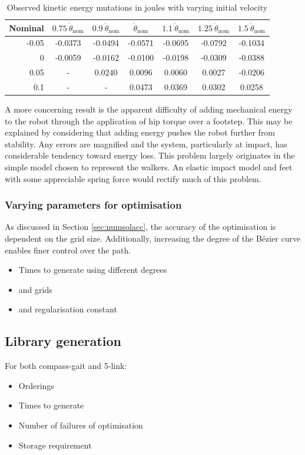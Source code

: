 \begin{table}
	\centering
	\begin{tabular}{ r || c | c | c | c | c | c}
		Nominal & $0.75~\dot{\theta}_{\mathrm{nom}}$ & $0.9~\dot{\theta}_{\mathrm{nom}}$ & $\dot{\theta}_{\mathrm{nom}}$ & $1.1~\dot{\theta}_{\mathrm{nom}}$ & $1.25~\dot{\theta}_{\mathrm{nom}}$ & $1.5~\dot{\theta}_{\mathrm{nom}}$ \\ \hline
		-0.05 & -0.0373 & -0.0494 & -0.0571 & -0.0695 & -0.0792 & -0.1034  \\
		0     & -0.0059 & -0.0162 & -0.0100 & -0.0198 & -0.0309 & -0.0388 \\
		0.05  &    -    &  0.0240 &  0.0096 &  0.0060 &  0.0027 & -0.0206  \\
		0.1   &    -    &    -    &  0.0473 &  0.0369 &  0.0302 &  0.0258
	\end{tabular}
	\caption[Observed kinetic energy mutations with varying initial velocity]{Observed kinetic energy mutations in joules with varying initial velocity}
	\label{tab:vcenergy}
\end{table}

A more concerning result is the apparent difficulty of adding mechanical energy to the robot through the application of hip torque over a footstep. This may be explained by considering that adding energy pushes the robot further from stability. Any errors are magnified and the system, particularly at impact, has considerable tendency toward energy loss. This problem largely originates in the simple model chosen to represent the walkers. An elastic impact model and feet with some appreciable spring force would rectify much of this problem.

\subsubsection{Varying parameters for optimisation}
As discussed in Section \ref{sec:numsolacc}, the accuracy of the optimisation is dependent on the grid size. Additionally, increasing the degree of the Bézier curve enables finer control over the path.

\begin{itemize}
	\item Times to generate using different degrees
	\item and grids
	\item and regularisation constant
\end{itemize}

\subsection{Library generation}
For both compass-gait and 5-link:
\begin{itemize}
	\item Orderings
	\item Times to generate
	\item Number of failures of optimisation
	\item Storage requirement
\end{itemize}